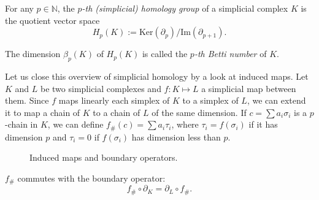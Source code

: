 \documentclass[a4paper,11pt,openany,extrafontsizes]{memoir}
\begin{document}
\begin{defn}[Homology]
  For any $p\in\mathbb{N}$, the \emph{$p$-th (simplicial) homology
    group} of a simplicial complex $K$ is the quotient vector space
  \[ H_p(K) := \mathrm{Ker}(\partial_{p}) /
    \mathrm{Im}(\partial_{p+1}). \]

  The dimension $\beta_p(K)$ of $H_p(K)$ is called the \emph{$p$-th
    Betti number} of $K$.
\end{defn}

Let us close this overview of simplicial homology by a look at induced
maps. Let $K$ and $L$ be two simplicial complexes and $f: K \mapsto L$
a simplicial map between them. Since $f$ maps linearly each simplex of
$K$ to a simplex of $L$, we can extend it to map a chain of $K$ to a
chain of $L$ of the same dimension. If $c = \sum a_i \sigma_i$ is a
$p$-chain in $K$, we can define $f_\#(c) = \sum a_i \tau_i$, where
$\tau_i = f(\sigma_i)$ if it has dimension $p$ and $\tau_i = 0$ if
$f(\sigma_i)$ has dimension less than $p$.

\begin{figure}[!ht]
  \centering
  \caption{Induced maps and boundary operators.}%
  \label{fig:induced-map}
\end{figure}

\begin{prop}
  $f_\#$ commutes with the boundary operator:
  \[ f_\# \circ \partial_K = \partial_L \circ f_\#. \]
\end{prop}
\end{document}
